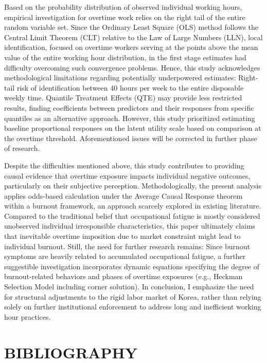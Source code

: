 \documentclass[
  12pt,
]{article}
\begin{document}
Based on the probability distribution of observed individual working
hours, empirical investigation for overtime work relies on the right
tail of the entire random variable set. Since the Ordinary Least Square
(OLS) method follows the Central Limit Theorem (CLT) relative to the Law
of Large Numbers (LLN), local identification, focused on overtime
workers serving at the points above the mean value of the entire working
hour distribution, in the first stage estimates had difficulty
overcoming such convergence problems. Hence, this study acknowledges
methodological limitations regarding potentially underpowered estimates:
Right-tail risk of identification between 40 hours per week to the
entire disposable weekly time. Quantile Treatment Effects (QTE) may
provide less restricted results, finding coefficients between predictors
and their responses from specific quantiles as an alternative approach.
However, this study prioritized estimating baseline proportional
responses on the latent utility scale based on comparison at the
overtime threshold. Aforementioned issues will be corrected in further
phase of research.

Despite the difficulties mentioned above, this study contributes to
providing causal evidence that overtime exposure impacts individual
negative outcomes, particularly on their subjective perception.
Methodologically, the present analysis applies odds-based calculation
under the Average Causal Response theorem within a burnout framework, an
approach scarcely explored in existing literature. Compared to the
traditional belief that occupational fatigue is mostly considered
unobserved individual irresponsible characteristics, this paper
ultimately claims that inevitable overtime imposition due to market
constraint might lead to individual burnout. Still, the need for further
research remains: Since burnout symptoms are heavily related to
accumulated occupational fatigue, a further suggestible investigation
incorporates dynamic equations specifying the degree of burnout-related
behaviors and phases of overtime exposures (e.g., Heckman Selection
Model including corner solution). In conclusion, I emphasize the need
for structural adjustments to the rigid labor market of Korea, rather
than relying solely on further institutional enforcement to address long
and inefficient working hour practices.

\newpage

\section*{BIBLIOGRAPHY}\label{bibliography}
\end{document}

